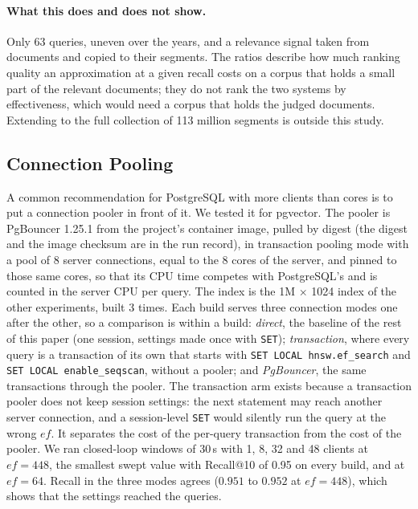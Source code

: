 \documentclass[sigconf, nonacm]{acmart}
\begin{document}
\paragraph{What this does and does not show.} Only 63 queries, uneven over the years, and a relevance
signal taken from documents and copied to their segments. The ratios describe how much ranking quality an approximation
at a given recall costs on a corpus that holds a small part of the relevant documents; they do not rank the two systems by
effectiveness, which would need a corpus that holds the judged documents. Extending to the full collection of 113 million
segments is outside this study.


\subsection{Connection Pooling}
\label{sec:pooling}

A common recommendation for PostgreSQL with more clients than cores is to put a connection pooler in front of it. We tested
it for pgvector. The pooler is PgBouncer 1.25.1 from the project's container image, pulled by digest (the digest and the
image checksum are in the run record), in transaction pooling mode with a pool of 8 server connections, equal to the 8 cores of the server, and
pinned to those same cores, so that its CPU time competes with PostgreSQL's and is counted in the server CPU per query. The
index is the 1M $\times$ 1024 index of the other experiments, built 3 times. Each build serves three connection modes one
after the other, so a comparison is within a build: \emph{direct}, the baseline of the rest of this paper (one session, settings
made once with \texttt{SET}); \emph{transaction}, where every query is a transaction of its own that starts with
\texttt{SET LOCAL hnsw.ef\_search} and \texttt{SET LOCAL enable\_seqscan}, without a pooler; and \emph{PgBouncer}, the same
transactions through the pooler. The transaction arm exists because a transaction pooler does not keep session settings: the
next statement may reach another server connection, and a session-level \texttt{SET} would silently run the query at the wrong
$ef$. It separates the cost of the per-query transaction from the cost of the pooler. We ran closed-loop windows of 30\,s with 1,
8, 32 and 48 clients at $ef=448$, the smallest swept value with Recall@10 of 0.95 on every build, and at $ef=64$. Recall
in the three modes agrees ($0.951$ to $0.952$ at $ef=448$), which shows that the settings reached the queries.
\end{document}
